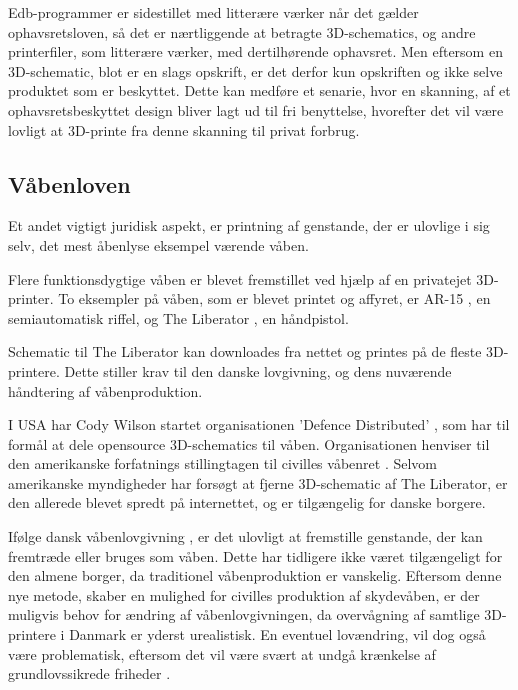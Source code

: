 Edb-programmer er sidestillet med litterære værker når det gælder ophavsretsloven\autocite{retsinformation.dk_ophavsretsloven_2010}, så det er nærtliggende at betragte 3D-schematics, og andre printerfiler, som litterære værker, med dertilhørende ophavsret. Men eftersom en 3D-schematic, blot er en slags opskrift, er det derfor kun opskriften og ikke selve produktet som er beskyttet. Dette kan medføre et senarie, hvor en skanning, af et ophavsretsbeskyttet design bliver lagt ud til fri benyttelse, hvorefter det vil være lovligt at 3D-printe fra denne skanning til privat forbrug.

\subsection{Våbenloven}

Et andet vigtigt juridisk aspekt, er printning af genstande, der er ulovlige i sig selv, det mest åbenlyse eksempel værende våben.

Flere funktionsdygtige våben er blevet fremstillet ved hjælp af en privatejet 3D-printer. To eksempler på våben, som er blevet printet og affyret, er AR-15 \autocite{vigild_amerikaner_2012}, en semiautomatisk riffel, og The Liberator \autocite{_state_????}, en håndpistol. 

Schematic til The Liberator kan downloades fra nettet og printes på de fleste 3D-printere. Dette stiller krav til den danske lovgivning, og dens nuværende håndtering af våbenproduktion.

I USA har Cody Wilson \autocite{_about_????} startet organisationen 'Defence Distributed' \autocite{_home_????}, som har til formål at dele opensource 3D-schematics til våben. Organisationen henviser til den amerikanske forfatnings stillingtagen til civilles våbenret \autocite{_about_????}. Selvom amerikanske myndigheder har forsøgt at fjerne 3D-schematic af The Liberator, er den allerede blevet spredt på internettet, og er tilgængelig for danske borgere.

Ifølge dansk våbenlovgivning \autocite{_vabenloven_????}, er det ulovligt at fremstille genstande, der kan fremtræde eller bruges som våben. Dette har tidligere ikke været tilgængeligt for den almene borger, da traditionel våbenproduktion er vanskelig. Eftersom denne nye metode, skaber en mulighed for civilles produktion af skydevåben, er der muligvis behov for ændring af våbenlovgivningen, da overvågning af samtlige 3D-printere i Danmark er yderst urealistisk. En eventuel lovændring, vil dog også være problematisk, eftersom det vil være svært at undgå krænkelse af grundlovssikrede friheder \autocite{_danmarks_????}.


